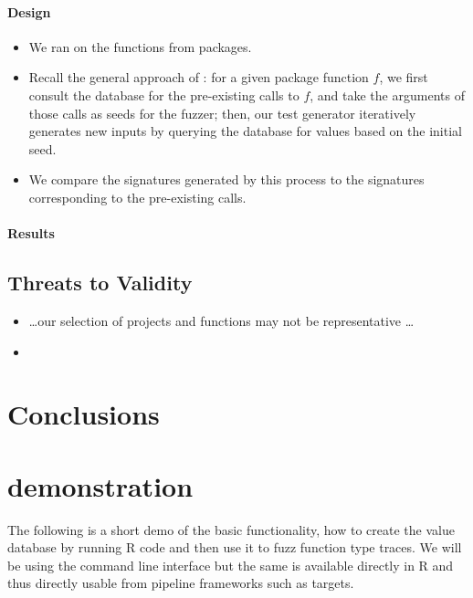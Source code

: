 \documentclass[sigplan,anonymous,review]{acmart}
\begin{document}
\paragraph{Design}
\begin{itemize}
    \item We ran \tool on the   functions from  packages.
    \item Recall the general approach of \tool: for a given package function $f$, we first consult the database for the pre-existing calls to $f$, and take the arguments of those calls as seeds for the fuzzer; then, our test generator iteratively generates new inputs by querying the database for values based on the initial seed.
    \item We compare the signatures generated by this process to the signatures corresponding to the pre-existing calls.
\end{itemize}

\paragraph{Results}

\subsection{Threats to Validity}

\begin{itemize}
    \item \ldots our selection of projects and functions may not be representative \ldots
    \item {}
\end{itemize}

\section{Conclusions}
\label{sec:conclusions}




\appendix

\section{\tool demonstration}

The following is a short demo of the basic \tool functionality, \Ie how to create the value database by running R code and then use it to fuzz function type traces.
We will be using the command line interface but the same is available directly in R and thus directly usable from pipeline frameworks such as targets.
\end{document}
